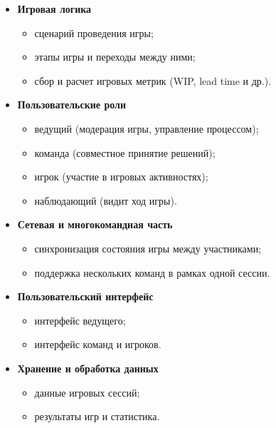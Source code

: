\begin{itemize}
\item \textbf{Игровая логика}

\begin{itemize}
\item сценарий проведения игры;
\item этапы игры и переходы между ними;
\item сбор и расчет игровых метрик (WIP, lead time и др.).
\end{itemize}
\end{itemize}

\begin{itemize}
\item \textbf{Пользовательские роли}

\begin{itemize}
\item ведущий (модерация игры, управление процессом);
\item команда (совместное принятие решений);
\item игрок (участие в игровых активностях);
\item наблюдающий (видит ход игры).
\end{itemize}
\end{itemize}

\begin{itemize}
\item \textbf{Сетевая и многокомандная часть}

\begin{itemize}
\item синхронизация состояния игры между участниками;
\item поддержка нескольких команд в рамках одной сессии.
\end{itemize}
\end{itemize}

\begin{itemize}
\item \textbf{Пользовательский интерфейс}

\begin{itemize}
\item интерфейс ведущего;
\item интерфейс команд и игроков.
\end{itemize}
\end{itemize}

\begin{itemize}
\item \textbf{Хранение и обработка данных}

\begin{itemize}
\item данные игровых сессий;
\item результаты игр и статистика.
\end{itemize}
\end{itemize}

